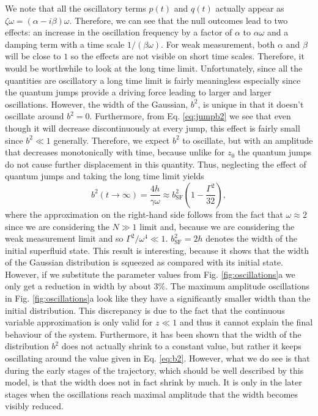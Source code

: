 We note that all the oscillatory terms $p(t)$ and $q(t)$ actually
appear as $\zeta \omega = (\alpha - i \beta) \omega$. Therefore, we
can see that the null outcomes lead to two effects: an increase in the
oscillation frequency by a factor of $\alpha$ to $\alpha \omega$ and a
damping term with a time scale $1/(\beta \omega)$. For weak
measurement, both $\alpha$ and $\beta$ will be close to $1$ so the
effects are not visible on short time scales. Therefore, it would be
worthwhile to look at the long time limit. Unfortunately, since all
the quantities are oscillatory a long time limit is fairly meaningless
especially since the quantum jumps provide a driving force leading to
larger and larger oscillations. However, the width of the Gaussian,
$b^2$, is unique in that it doesn't oscillate around $b^2 =
0$. Furthermore, from Eq. \eqref{eq:jumpb2} we see that even though it
will decrease discontinuously at every jump, this effect is fairly
small since $b^2 \ll 1$ generally. Therefore, we expect $b^2$ to
oscillate, but with an amplitude that decreases monotonically with
time, because unlike for $z_0$ the quantum jumps do not cause further
displacement in this quantity. Thus, neglecting the effect of quantum
jumps and taking the long time limit yields
\begin{equation}
  \label{eq:b2}
  b^2(t \rightarrow \infty) = \frac{4 h} {\gamma \omega} \approx
  b^2_\mathrm{SF} \left( 1 - \frac{\Gamma^2}{32} \right),
\end{equation}
where the approximation on the right-hand side follows from the fact
that $\omega \approx 2$ since we are considering the $N \gg 1$ limit
and, because we are considering the weak measurement limit and so
$\Gamma^2 / \omega^4 \ll 1$. $b^2_\mathrm{SF} = 2h$ denotes the width
of the initial superfluid state. This result is interesting, because
it shows that the width of the Gaussian distribution is squeezed as
compared with its initial state. However, if we substitute the
parameter values from Fig. \ref{fig:oscillations}a we only get a
reduction in width by about $3\%$. The maximum amplitude oscillations
in Fig. \ref{fig:oscillations}a look like they have a significantly
smaller width than the initial distribution. This discrepancy is due
to the fact that the continuous variable approximation is only valid
for $z \ll 1$ and thus it cannot explain the final behaviour of the
system. Furthermore, it has been shown that the width of the
distribution $b^2$ does not actually shrink to a constant value, but
rather it keeps oscillating around the value given in
Eq. \eqref{eq:b2}. However, what we do see is that during the early
stages of the trajectory, which should be well described by this
model, is that the width does not in fact shrink by much. It is only
in the later stages when the oscillations reach maximal amplitude that
the width becomes visibly reduced.

